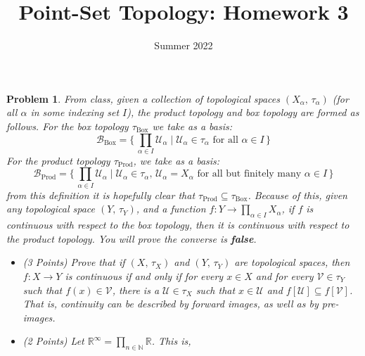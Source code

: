 \documentclass{article}
\title{Point-Set Topology: Homework 3}
\date{Summer 2022}
\theoremstyle{normal}
\newtheorem{problem}{Problem}
\begin{document}
    \maketitle
    \begin{problem}
        From class, given a collection of topological spaces
        $(X_{\alpha},\,\tau_{\alpha})$ (for all $\alpha$ in some indexing set
        $I$), the product topology and box topology are formed as follows.
        For the box topology $\tau_{\textrm{Box}}$ we take as a basis:
        \begin{equation}
            \mathcal{B}_{\textrm{Box}}
            =\Big\{\,\prod_{\alpha\in{I}}\mathcal{U}_{\alpha}\;|\;
                \mathcal{U}_{\alpha}\in\tau_{\alpha}
                \textrm{ for all }\alpha\in{I}\,\Big\}
        \end{equation}
        For the product topology $\tau_{\textrm{Prod}}$, we take as a basis:
        \begin{equation}
            \mathcal{B}_{\textrm{Prod}}
            =\Big\{\,\prod_{\alpha\in{I}}\mathcal{U}_{\alpha}\;|\;
                \mathcal{U}_{\alpha}\in\tau_{\alpha},\,
                \mathcal{U}_{\alpha}=X_{\alpha}
                \textrm{ for all but finitely many }\alpha\in{I}\,\Big\}
        \end{equation}
        from this definition it is hopefully clear that
        $\tau_{\textrm{Prod}}\subseteq\tau_{\textrm{Box}}$. Because of this,
        given any topological space $(Y,\,\tau_{Y})$, and a function
        $f:Y\rightarrow\prod_{\alpha\in{I}}X_{\alpha}$, if $f$ is continuous
        with respect to the box topology, then it is continuous with respect to
        the product topology. You will prove the converse is \textbf{false}.
        \begin{itemize}
            \item (3 Points) Prove that if $(X,\,\tau_{X})$ and
                $(Y,\,\tau_{Y})$ are topological spaces, then
                $f:X\rightarrow{Y}$ is continuous if and only if for every
                $x\in{X}$ and for every $\mathcal{V}\in\tau_{Y}$ such that
                $f(x)\in\mathcal{V}$, there is a $\mathcal{U}\in\tau_{X}$ such
                that $x\in\mathcal{U}$ and
                $f[\mathcal{U}]\subseteq{f}[\mathcal{V}]$. That is, continuity
                can be described by forward images, as well as by pre-images.
            \item (2 Points) Let
                $\mathbb{R}^{\infty}=\prod_{n\in\mathbb{N}}\mathbb{R}$. This is,

\end{itemize}
\end{problem}
\end{document}
